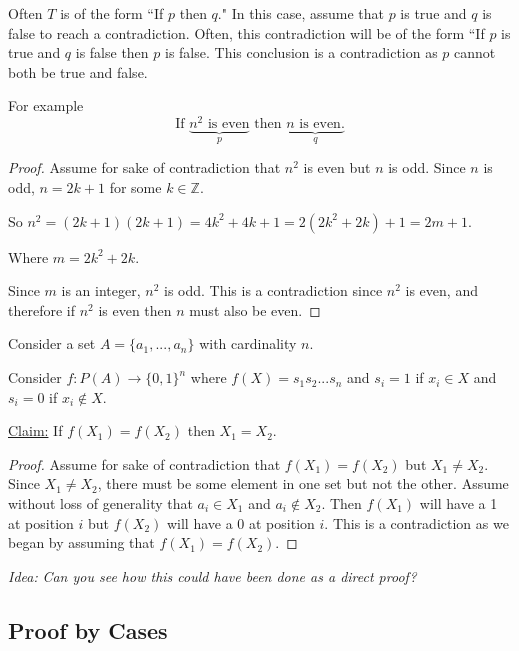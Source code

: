 \documentclass[12pt,letterpaper]{article}
\newcommand{\claim}{\underline{Claim:} }
\newcommand{\idea}{\textit{Idea:} }
\newcommand\Z{\mathbb Z}
\begin{document}
    Often $T$ is of the form ``If $p$ then $q$." In this case, assume that $p$ is true and $q$ is false to reach a contradiction. Often, this contradiction will be of the form ``If $p$ is true and $q$ is false then $p$ is false. This conclusion is a contradiction as $p$ cannot both be true and false. 
    
    \begin{mdframed}
    For example 
    $$ \text{If }\underbrace{n^2 \text{ is even}}_{p} \text{ then } \underbrace{n \text{ is even.}}_{q}$$


    \begin{proof} Assume for sake of contradiction that $n^2$ is even but $n$ is odd. Since $n$ is odd, $n = 2k+1$ for some $k \in \Z$.

      So $n^2 = (2k+1)(2k+1) = 4k^2 + 4k + 1 = 2(2k^2 + 2k) + 1 = 2m+1$.

      Where $m =  2k^2 + 2k$.

      Since $m$ is an integer, $n^2$ is odd. This is a contradiction since $n^2$ is even, and therefore if $n^2$ is even then $n$ must also be even.
    \end{proof}
    
    \end{mdframed}
      
    \begin{mdframed}
        Consider a set $A = \{a_1,...,a_n\}$ with cardinality $n$.
        
        Consider $f:P(A) \rightarrow \{0,1\}^n$ where $f(X) = s_1s_2...s_n$ and $s_i = 1$ if $x_i \in X$ and $s_i = 0$ if $x_i \not\in X$. 
        
        \claim If $f(X_1) = f(X_2)$ then $X_1 = X_2$. 
                
        \begin{proof}
        Assume for sake of contradiction that $f(X_1) = f(X_2)$ but $X_1 \not= X_2$. Since $X_1 \not= X_2$, there must be some element in one set but not the other. Assume without loss of generality that $a_i \in X_1$ and $a_i \not\in X_2$. Then $f(X_1)$ will have a 1 at position $i$ but $f(X_2)$ will have a 0 at position $i$. This is a contradiction as we began by assuming that $f(X_1) = f(X_2)$. 
        \end{proof}
        
        \idea \textit{Can you see how this could have been done as a direct proof?}
    \end{mdframed}
    
    \subsection{Proof by Cases}
        
\end{document}
